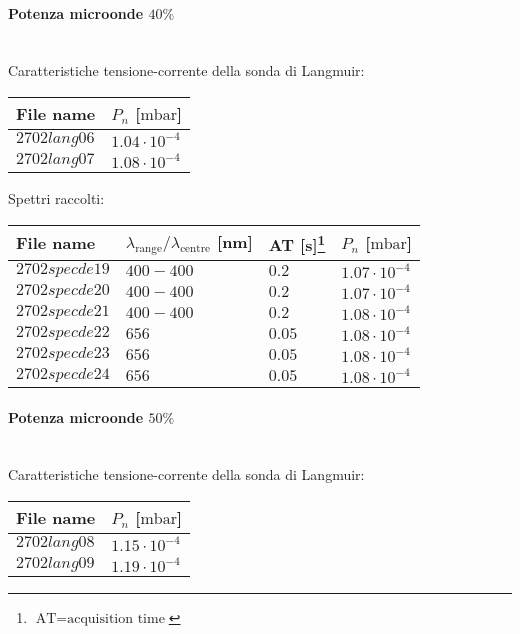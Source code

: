 \paragraph*{Potenza microonde $\text{40\%}$} ~\\
Caratteristiche tensione-corrente della sonda di Langmuir:
\begin{center}
\begin{tabular}{p{3cm}p{3cm}}
\toprule
File name	&$P_n$ [$\si{\milli\bar}$]\\
\midrule
$2702lang06$	&$1.04\cdot10^{-4}$\\
$2702lang07$	&$1.08\cdot10^{-4}$\\
\bottomrule
\end{tabular}
\end{center}

Spettri raccolti:
\begin{center}
\begin{tabular}{p{3cm}p{4cm}p{2cm}p{3cm}}
\toprule
File name	&$\lambda_\text{range}\text{/}\lambda_\text{centre}$ [nm] 	&AT [s]\footnote{$\text{AT}=\text{acquisition time}$} &$P_n$ [$\si{\milli\bar}$]\\
\midrule
$2702specde19$	&$400-400$	&$0.2$		&$1.07\cdot10^{-4}$\\
$2702specde20$	&$400-400$	&$0.2$		&$1.07\cdot10^{-4}$\\
$2702specde21$	&$400-400$	&$0.2$		&$1.08\cdot10^{-4}$\\
$2702specde22$	&$656$		&$0.05$		&$1.08\cdot10^{-4}$\\
$2702specde23$	&$656$		&$0.05$		&$1.08\cdot10^{-4}$\\
$2702specde24$	&$656$		&$0.05$		&$1.08\cdot10^{-4}$\\
\bottomrule
\end{tabular}
\end{center}

\paragraph*{Potenza microonde $\text{50\%}$} ~\\
Caratteristiche tensione-corrente della sonda di Langmuir:
\begin{center}
\begin{tabular}{p{3cm}p{3cm}}
\toprule
File name	&$P_n$ [$\si{\milli\bar}$]\\
\midrule
$2702lang08$	&$1.15\cdot10^{-4}$\\
$2702lang09$	&$1.19\cdot10^{-4}$\\
\bottomrule
\end{tabular}
\end{center}

